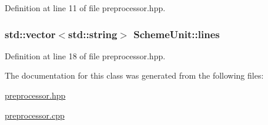 Definition at line 11 of file preprocessor.\+hpp.

\hypertarget{class_scheme_unit_a03fe6130875cfc25975efc5a6f7981da}{}
\subsubsection[{lines}]{\setlength{\rightskip}{0pt plus 5cm}std\+::vector$<$std\+::string$>$ Scheme\+Unit\+::lines}\label{class_scheme_unit_a03fe6130875cfc25975efc5a6f7981da}


Definition at line 18 of file preprocessor.\+hpp.



The documentation for this class was generated from the following files\+:\begin{DoxyCompactItemize}
\item 
\hyperlink{preprocessor_8hpp}{preprocessor.\+hpp}\item 
\hyperlink{preprocessor_8cpp}{preprocessor.\+cpp}\end{DoxyCompactItemize}
